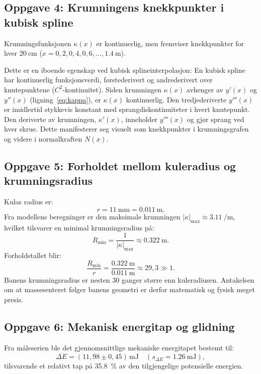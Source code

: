 \documentclass[11pt,a4paper]{article}
\begin{document}
\subsection*{Oppgave 4: Krumningens knekkpunkter i kubisk spline}
Krumningsfunksjonen $\kappa(x)$ er kontinuerlig, men fremviser knekkpunkter for hver $\SI{20}{\centi\meter}$ ($x = 0{,}2, 0{,}4, 0{,}6, \dots, \SI{1,4}{\meter}$).

Dette er en iboende egenskap ved kubisk splineinterpolasjon: En kubisk spline har kontinuerlig funksjonsverdi, førstederivert og andrederivert over knutepunktene ($C^2$-kontinuitet). Siden krumningen $\kappa(x)$ avhenger av $y'(x)$ og $y''(x)$ (ligning~\eqref{eq:kappa}), er $\kappa(x)$ kontinuerlig. Den tredjederiverte $y'''(x)$ er imidlertid stykkevis konstant med sprangdiskontinuiteter i hvert knutepunkt. Den deriverte av krumningen, $\kappa'(x)$, inneholder $y'''(x)$ og gjør sprang ved hver skrue. Dette manifesterer seg visuelt som knekkpunkter i krumningsgrafen og videre i normalkraften $N(x)$.

\subsection*{Oppgave 5: Forholdet mellom kuleradius og krumningsradius}
Kulas radius er:
\begin{equation*}
    r = \SI{11}{\milli\meter} = \SI{0,011}{\meter}.
\end{equation*}
Fra modellens beregninger er den maksimale krumningen $|\kappa|_{\max} \approx \SI{3,11}{\per\meter}$, hvilket tilsvarer en minimal krumningsradius på:
\begin{equation*}
    R_{\min} = \frac{1}{|\kappa|_{\max}} \approx \SI{0,322}{\meter}.
\end{equation*}
Forholdstallet blir:
\begin{equation}
    \frac{R_{\min}}{r} = \frac{\SI{0,322}{\meter}}{\SI{0,011}{\meter}} \approx 29{,}3 \gg 1.
    \tag{S5}
\end{equation}
Banens krumningsradius er nesten 30 ganger større enn kuleradiusen. Antakelsen om at massesenteret følger banens geometri er derfor matematisk og fysisk meget presis.

\subsection*{Oppgave 6: Mekanisk energitap og glidning}
Fra måleserien ble det gjennomsnittlige mekaniske energitapet bestemt til:
\begin{equation*}
    \overline{\Delta E} = (11{,}98 \pm 0{,}45)\,\si{\milli\joule} \quad (s_{\Delta E} = \SI{1,26}{\milli\joule}),
\end{equation*}
tilsvarende et relativt tap på \SI{35,8}{\percent} av den tilgjengelige potensielle energien.
\end{document}
